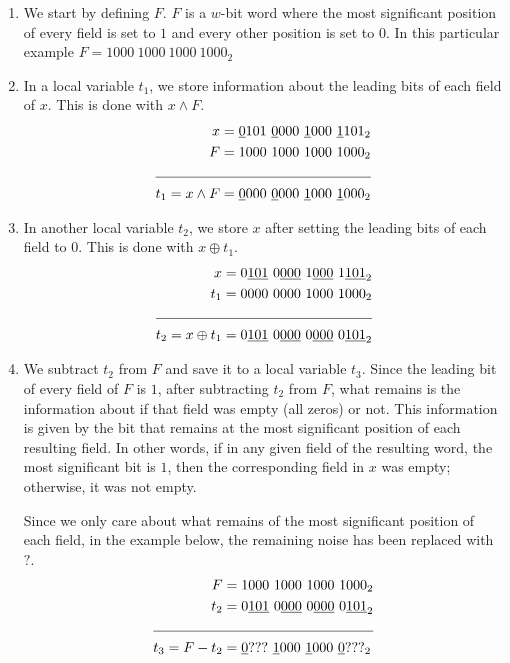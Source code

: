 \begin{enumerate}
    \item \label{blt:msb1}
    We start by defining $F$. $F$ is a $w$-bit word where the most significant position of every field is set to $1$ and every other position is set to $0$. In this particular example $F = 1000\ 1000\ 1000\ 1000_2$
    
    \item \label{blt:msb2}
    In a local variable $t_1$, we store information about the leading bits of each field of $x$. This is done with $x \wedge F$.
    \begin{align*}
                       x &= \underline{0}101\ \underline{0}000\ \underline{1}000\ \underline{1}101_2 \\
                       F &= 1000\ 1000\ 1000\ 1000_2 \\ \cline{1-2} 
        t_1 = x \wedge F &= \underline{0}000\ \underline{0}000\ \underline{1}000\ \underline{1}000_2
    \end{align*}
    
    \item \label{blt:msb3}
    In another local variable $t_2$, we store $x$ after setting the leading bits of each field to $0$. This is done with $x \oplus t_1$.
    \begin{align*}
                         x &= 0\underline{101}\ 0\underline{000}\ 1\underline{000}\ 1\underline{101}_2 \\
                       t_1 &= 0000\ 0000\ 1000\ 1000_2 \\ \cline{1-2}
        t_2 = x \oplus t_1 &= 0\underline{101}\ 0\underline{000}\ 0\underline{000}\ 0\underline{101}_2
    \end{align*}
    
    \item \label{blt:msb4}
    We subtract $t_2$ from $F$ and save it to a local variable $t_3$. Since the leading bit of every field of $F$ is $1$, after subtracting $t_2$ from $F$, what remains is the information about if that field was empty (all zeros) or not. This information is given by the bit that remains at the most significant position of each resulting field. In other words, if in any given field of the resulting word, the most significant bit is $1$, then the corresponding field in $x$ was empty; otherwise, it was not empty.
    
    Since we only care about what remains of the most significant position of each field, in the example below, the remaining noise has been replaced with $?$.
    \begin{align*}
                    F &= 1000\ 1000\ 1000\ 1000_2 \\
                  t_2 &= 0\underline{101}\ 0\underline{000}\ 0\underline{000}\ 0\underline{101}_2 \\ \cline{1-2} 
        t_3 = F - t_2 &= \underline{0}???\ \underline{1}000\ \underline{1}000\ \underline{0}???_2
    \end{align*}
    

\end{enumerate}
